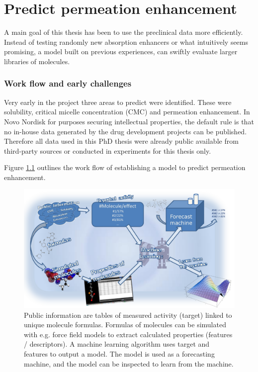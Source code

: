 \chapter{Predict permeation enhancement}

A main goal of this thesis has been to use the preclinical data more efficiently. Instead of testing randomly new absorption enhancers or what intuitively seems promising, a model built on previous experiences, can swiftly evaluate larger libraries of molecules.

\subsection{Work flow and early challenges}
\label{predPerm:workflow}

Very early in the project three areas to predict were identified. These were solubility, critical micelle concentration (CMC) and permeation enhancement. In Novo Nordisk for purposes securing intellectual properties, the default rule is that no in-house data generated by the drug development projects can be published. Therefore all data used in this PhD thesis were already public available from third-party sources or conducted in experiments for this thesis only.

Figure \ref{predict_workflow} outlines the work flow of establishing a model to predict permeation enhancement.

\begin{figure}[!htbp]

\includegraphics[width=\textwidth, height=\textheight, keepaspectratio]{graphics/predictPotencySummary.pdf}
\caption{Public information are tables of measured activity (target) linked to unique molecule formulas. Formulas of molecules can be simulated with e.g. force field models to extract calculated properties (features / descriptors). A machine learning algorithm uses target and features to output a model. The model is used as a forecasting machine, and the model can be inspected to learn from the machine.}
\label{predict_workflow}
\end{figure}

